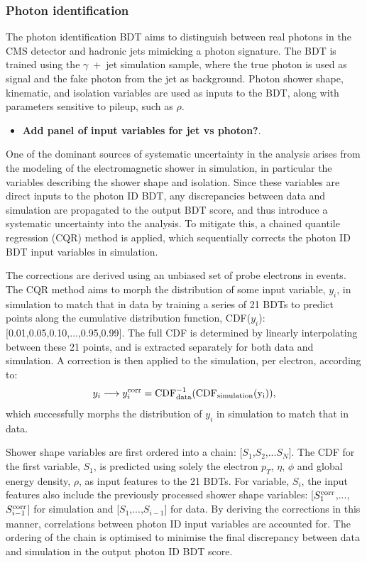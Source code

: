 \subsubsection{Photon identification}
The photon identification BDT aims to distinguish between real photons in the CMS detector and hadronic jets mimicking a photon signature. The BDT is trained using the $\gamma$~+~jet simulation sample, where the true photon is used as signal and the fake photon from the jet as background. Photon shower shape, kinematic, and isolation variables are used as inputs to the BDT, along with parameters sensitive to pileup, such as $\rho$. 

\begin{itemize}
    \item \textbf{Add panel of input variables for jet vs photon?}.
\end{itemize}

One of the dominant sources of systematic uncertainty in the \Hgg analysis arises from the modeling of the electromagnetic shower in simulation, in particular the variables describing the shower shape and isolation. Since these variables are direct inputs to the photon ID BDT, any discrepancies between data and simulation are propagated to the output BDT score, and thus introduce a systematic uncertainty into the analysis. To mitigate this, a chained quantile regression (CQR) method is applied, which sequentially corrects the photon ID BDT input variables in simulation. 

The corrections are derived using an unbiased set of probe electrons in \Zee events. The CQR method aims to morph the distribution of some input variable, $y_i$, in simulation to match that in data by training a series of 21 BDTs to predict points along the cumulative distribution function, CDF($y_i$): [0.01,0.05,0.10,...,0.95,0.99]. The full CDF is determined by linearly interpolating between these 21 points, and is extracted separately for both data and simulation. A correction is then applied to the simulation, per electron, according to:
\begin{equation}
    y_i \longrightarrow y_i^{\rm{corr}} = \rm{CDF}^{-1}_{\rm{data}}(\rm{CDF}_{\rm{simulation}}(y_i)),
\end{equation}
\noindent 
which successfully morphs the distribution of $y_i$ in simulation to match that in data. 

Shower shape variables are first ordered into a chain: [$S_1$,$S_2$,...$S_N$]. The CDF for the first variable, $S_1$, is predicted using solely the electron $p_T$, $\eta$, $\phi$ and global energy density, $\rho$, as input features to the 21 BDTs. For variable, $S_i$, the input features also include the previously processed shower shape variables: [$S^{\rm{corr}}_1$,...,$S^{\rm{corr}}_{i-1}$] for simulation and [$S_1$,...,$S_{i-1}$] for data. By deriving the corrections in this manner, correlations between photon ID input variables are accounted for. The ordering of the chain is optimised to minimise the final discrepancy between data and simulation in the output photon ID BDT score.

